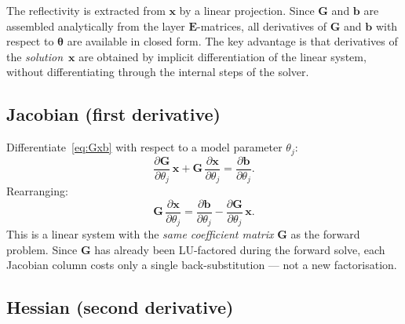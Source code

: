\documentclass[11pt,a4paper]{article}
\newcommand{\ppd}[2]{\frac{\partial #1}{\partial #2}}
\theoremstyle{plain}
\theoremstyle{remark}
\begin{document}
The reflectivity is extracted from $\mathbf{x}$ by a linear projection.
Since $\mathbf{G}$ and $\mathbf{b}$ are assembled analytically from the
layer $\mathbf{E}$-matrices, all derivatives of $\mathbf{G}$ and
$\mathbf{b}$ with respect to $\bm{\theta}$ are available in closed form.
The key advantage is that derivatives of the \emph{solution}~$\mathbf{x}$
are obtained by implicit differentiation of the linear system, without
differentiating through the internal steps of the solver.

\subsection{Jacobian (first derivative)}\label{sec:gmm-jac}

Differentiate~\eqref{eq:Gxb} with respect to a model parameter $\theta_j$:
\begin{equation}\label{eq:dGxb}
  \ppd{\mathbf{G}}{\theta_j}\,\mathbf{x}
  + \mathbf{G}\,\ppd{\mathbf{x}}{\theta_j}
  = \ppd{\mathbf{b}}{\theta_j}.
\end{equation}
Rearranging:
\begin{equation}\label{eq:jac-solve}
  \boxed{
  \mathbf{G}\,\ppd{\mathbf{x}}{\theta_j}
  = \ppd{\mathbf{b}}{\theta_j}
    - \ppd{\mathbf{G}}{\theta_j}\,\mathbf{x}.
  }
\end{equation}
This is a linear system with the \emph{same coefficient matrix}
$\mathbf{G}$ as the forward problem.  Since $\mathbf{G}$ has already been
LU-factored during the forward solve, each Jacobian column costs only a
single back-substitution --- not a new factorisation.

\subsection{Hessian (second derivative)}\label{sec:gmm-hess}
\end{document}
